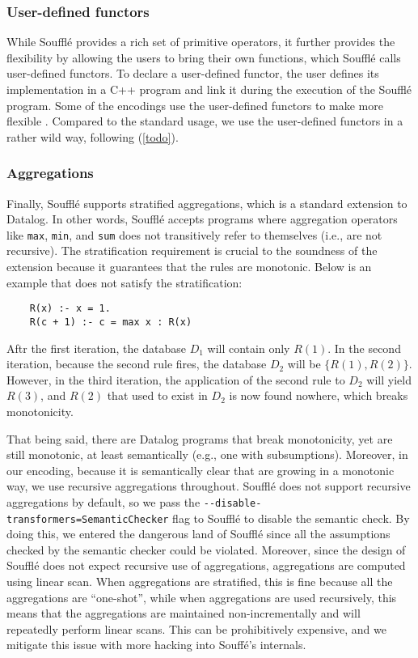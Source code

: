 \subsubsection*{User-defined functors}
While Souffl\'e provides a rich set of primitive operators,
 it further provides the flexibility by allowing the users
 to bring their own functions, which Souffl\'e calls
 user-defined functors.
To declare a user-defined functor, 
 the user defines its implementation in a C++ program and
 link it during the execution of the Souffl\'e program.
Some of the encodings use the user-defined functors 
 to make \eqrel{} more flexible \citep{zucker-udf-1,zucker-udf-2}.
Compared to the standard usage, 
 we use the user-defined functors in a rather wild way, 
 following \citep{zucker-udf-1} (\autoref{todo}).

\subsubsection*{Aggregations}
Finally, Souffl\'e supports stratified aggregations, 
 which is a standard extension to Datalog.
In other words, 
 Souffl\'e accepts programs where 
 aggregation operators like \texttt{max}, \texttt{min}, and \texttt{sum}
 does not transitively refer to themselves (i.e., are not recursive).
The stratification requirement is crucial to the soundness of the extension
 because it guarantees that the rules are monotonic.
Below is an example that does not satisfy the stratification:
\begin{verbatim}
    R(x) :- x = 1.
    R(c + 1) :- c = max x : R(x)
\end{verbatim}
Aftr the first iteration, the database $D_1$ will contain only $R(1)$. 
In the second iteration, because the second rule fires,
 the database $D_2$ will be $\{R(1), R(2)\}$.
However, in the third iteration,
 the application of the second rule to $D_2$ will yield
 $R(3)$, and $R(2)$ that used to exist in $D_2$ is now found nowhere,
 which breaks monotonicity.

That being said, there are Datalog programs that break monotonicity,
 yet are still monotonic, at least semantically (e.g., one with subsumptions).
Moreover, in our encoding, because it is semantically clear that 
 \egraphs are growing in a monotonic way, we use recursive aggregations 
 throughout.
Souffl\'e does not support recursive aggregations by default,
 so we pass the \verb|--disable-transformers=SemanticChecker|
 flag to Souffl\'e to disable the semantic check.
By doing this, 
 we entered the dangerous land of Souffl\'e 
 since all the assumptions checked by the semantic checker
 could be violated.
Moreover,
 since the design of Souffl\'e does not expect
 recursive use of aggregations,
 aggregations are computed using linear scan.
When aggregations are stratified,
 this is fine because all the aggregations are ``one-shot'',
 while when aggregations are used recursively, 
 this means that the aggregations
 are maintained non-incrementally 
 and will repeatedly perform linear scans.
This can be prohibitively expensive, 
 and we mitigate this issue with more hacking into Souff\'e's internals.

